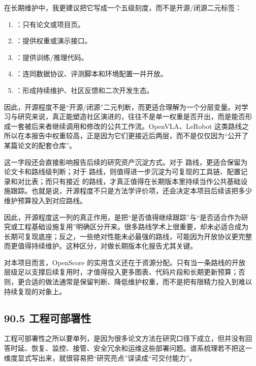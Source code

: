 在长期维护中，我更建议把它写成一个五级刻度，而不是开源/闭源二元标签：

\begin{enumerate}
\item \texttt{}：只有论文或项目页。
\item \texttt{}：提供权重或演示接口。
\item \texttt{}：提供训练/推理代码。
\item \texttt{}：连同数据协议、评测脚本和环境配置一并开放。
\item \texttt{}：形成持续维护、社区反馈和二次开发生态。
\end{enumerate}

因此，开源程度不是“开源/闭源”二元判断，而更适合理解为一个分层变量。对学习与研究来说，真正能塑造社区演进的，往往不是单一权重是否开出，而是能否形成一套被后来者继续调用和修改的公共工作流。OpenVLA、LeRobot 这类路线之所以在本报告中权重较高，正是因为它们更接近后两层，而不是仅仅因为“公开了某篇论文的配套仓库”。

这一字段还会直接影响报告后续的研究资产沉淀方式。对于 \texttt{} 路线，更适合保留为论文卡和路线级判断；对于 \texttt{} 路线，则值得进一步沉淀为可复现的工具链、配置记录和对比表；而只有接近 \texttt{} 的路线，才真正值得在长期版本里持续当作公共基础设施跟踪。也就是说，开源程度不只是方法学评价项，还会决定本项目后续该把多少维护预算投入到对应路线。

因此，开源程度这一列的真正作用，是把“是否值得继续跟踪”与“是否适合作为研究或工程基础设施复用”明确区分开来。很多路线学术上很重要，却未必适合成为长期可复现底座；反之，一些绝对性能未必最强的路线，可能因为开放协议更完整而更值得持续维护。这种区分，对做长期版本化报告尤其关键。

对本项目而言，OpenScore 的实用含义还在于资源分配。只有当一条路线的开放层级足以支撑后续复用时，才值得投入更多图表、代码片段和长期更新预算；否则，更合适的做法通常是保留判断、降低维护权重，而不是把有限精力投入到难以持续复现的对象上。

\subsection*{90.5 工程可部署性}


工程可部署性之所以要单列，是因为很多论文方法在研究口径下成立，但并没有回答时延、恢复、监控、接管、安全冗余和运维这些部署问题。谱系梳理若不把这一维度显式写出来，就很容易把“研究亮点”误读成“可交付能力”。

